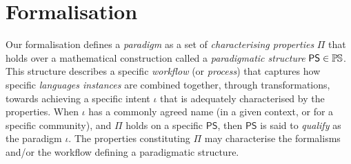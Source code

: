 \section{Formalisation}
\label{sec:Formalisation}

Our formalisation defines a \emph{paradigm} as a set of 
\emph{characterising properties} $\mathsf{\Pi}$ that holds over a mathematical 
construction called a \emph{paradigmatic structure} $\mathsf{PS}\in \mathbb{P}\mskip-1mu\mathbb{S}$. 
This structure describes a specific \emph{workflow} (or \emph{process}) that 
captures how specific \emph{languages instances} are combined together, 
through transformations, towards achieving a specific intent $\iota$ that is 
adequately characterised by the properties. When $\iota$ has a commonly agreed 
name (in a given context, or for a specific community), and $\mathsf{\Pi}$ holds 
on a specific $\mathsf{PS}$, then $\mathsf{PS}$ is said to \emph{qualify} as 
the paradigm $\iota$. The properties constituting $\mathsf{\Pi}$ may 
characterise the formalisms and/or the workflow defining a paradigmatic 
structure. 


